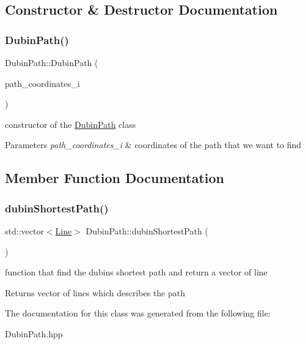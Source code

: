 \subsection{Constructor \& Destructor Documentation}
\mbox{\label{class_dubin_path_a095a22d8f3c9780b09fc1e48be9011b3}} 
\subsubsection{\texorpdfstring{Dubin\+Path()}{DubinPath()}}
{\footnotesize\ttfamily Dubin\+Path\+::\+Dubin\+Path (\begin{DoxyParamCaption}\item[{\mbox{\hyperlink{class_path_coordinates}{Path\+Coordinates}}}]{path\+\_\+coordinates\+\_\+i }\end{DoxyParamCaption})}



constructor of the \mbox{\hyperlink{class_dubin_path}{Dubin\+Path}} class 


\begin{DoxyParams}{Parameters}
{\em path\+\_\+coordinates\+\_\+i} & coordinates of the path that we want to find \\
\hline
\end{DoxyParams}


\subsection{Member Function Documentation}
\mbox{\label{class_dubin_path_a260513ceab4e25a5a8867ea2701fbb68}} 
\subsubsection{\texorpdfstring{dubin\+Shortest\+Path()}{dubinShortestPath()}}
{\footnotesize\ttfamily std\+::vector$<$\mbox{\hyperlink{class_line}{Line}}$>$ Dubin\+Path\+::dubin\+Shortest\+Path (\begin{DoxyParamCaption}{ }\end{DoxyParamCaption})}



function that find the dubins shortest path and return a vector of line 

\begin{DoxyReturn}{Returns}
vector of lines which describes the path 
\end{DoxyReturn}


The documentation for this class was generated from the following file\+:\begin{DoxyCompactItemize}
\item 
Dubin\+Path.\+hpp\end{DoxyCompactItemize}
